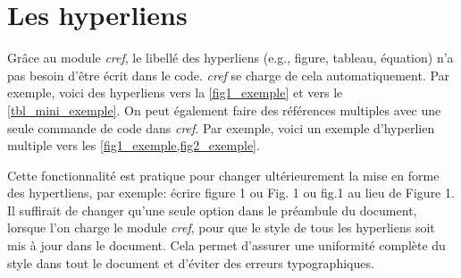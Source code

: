\documentclass[../exemple_master.tex]{subfiles}
\begin{document}
\section{Les hyperliens}

Grâce au module \emph{cref}, le libellé des hyperliens (e.g., figure, tableau, équation) n'a pas besoin d'être écrit dans le code. \emph{cref} se charge de cela automatiquement. Par exemple, voici des hyperliens vers la \cref{fig1_exemple} et vers le \cref{tbl_mini_exemple}. On peut également faire des références multiples avec une seule commande de code dans \emph{cref}. Par exemple, voici un exemple d'hyperlien multiple vers les \cref{fig1_exemple,fig2_exemple}.

Cette fonctionnalité est pratique pour changer ultérieurement la mise en forme des hypertliens, par exemple: écrire figure 1 ou Fig. 1 ou fig.1 au lieu de Figure 1. Il suffirait de changer qu'une seule option dans le préambule du document, lorsque l'on charge le module \emph{cref}, pour que le style de tous les hyperliens soit mis à jour dans le document. Cela permet d'assurer une uniformité complète du style dans tout le document et d'éviter des erreurs typographiques.
\end{document}
